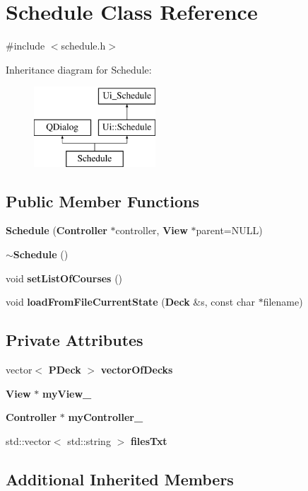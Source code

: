 \section{Schedule Class Reference}
\label{class_schedule}


{\ttfamily \#include $<$schedule.\-h$>$}

Inheritance diagram for Schedule\-:\begin{figure}[H]
\begin{center}
\leavevmode
\includegraphics[height=3.000000cm]{class_schedule}
\end{center}
\end{figure}
\subsection*{Public Member Functions}
\begin{DoxyCompactItemize}
\item 
{\bf Schedule} ({\bf Controller} $\ast$controller, {\bf View} $\ast$parent=N\-U\-L\-L)
\item 
{\bf $\sim$\-Schedule} ()
\item 
void {\bf set\-List\-Of\-Courses} ()
\item 
void {\bf load\-From\-File\-Current\-State} ({\bf Deck} \&s, const char $\ast$filename)
\end{DoxyCompactItemize}
\subsection*{Private Attributes}
\begin{DoxyCompactItemize}
\item 
vector$<$ {\bf P\-Deck} $>$ {\bf vector\-Of\-Decks}
\item 
{\bf View} $\ast$ {\bf my\-View\-\_\-}
\item 
{\bf Controller} $\ast$ {\bf my\-Controller\-\_\-}
\item 
std\-::vector$<$ std\-::string $>$ {\bf files\-Txt}
\end{DoxyCompactItemize}
\subsection*{Additional Inherited Members}


